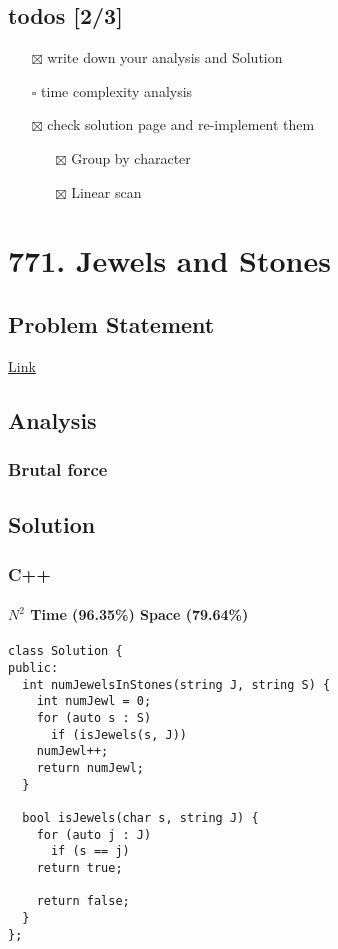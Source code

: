 \documentclass[12pt]{article}
\begin{document}
\subsection{todos [2/3]}
\label{sec:org6a942d2}
\begin{itemize}
\item[{$\boxtimes$}] write down your analysis and Solution
\item[{$\square$}] time complexity analysis
\item[{$\boxtimes$}] check solution page and re-implement them
\begin{itemize}
\item[{$\boxtimes$}] Group by character
\item[{$\boxtimes$}] Linear scan
\end{itemize}
\end{itemize}
\section{771. Jewels and Stones}
\label{sec:orged8d7ad}
\subsection{Problem Statement}
\label{sec:org90501b4}
\href{https://leetcode.com/problems/jewels-and-stones/}{Link}
\subsection{Analysis}
\label{sec:org53f97e8}
\subsubsection{Brutal force}
\label{sec:org347617f}
\subsection{Solution}
\label{sec:org3573209}
\subsubsection{C++}
\label{sec:orgdf45869}
\paragraph{\(N^2\) Time (96.35\%) Space (79.64\%)}
\label{sec:org0399c01}
\begin{verbatim}
class Solution {
public:
  int numJewelsInStones(string J, string S) {
    int numJewl = 0;
    for (auto s : S)
      if (isJewels(s, J))
	numJewl++;
    return numJewl;
  }

  bool isJewels(char s, string J) {
    for (auto j : J)
      if (s == j)
	return true;

    return false;
  }
};
\end{verbatim}
\end{document}
